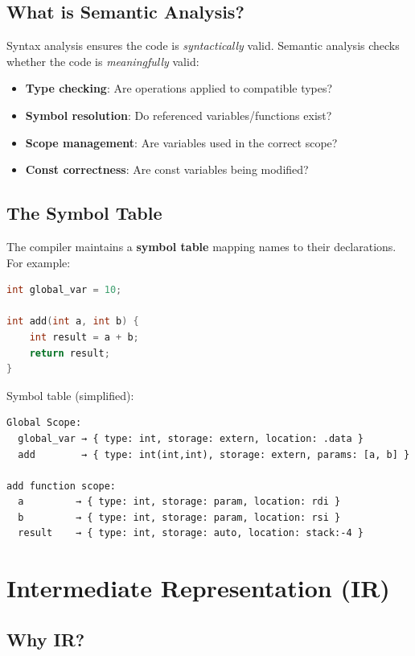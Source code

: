 \subsection{What is Semantic Analysis?}

Syntax analysis ensures the code is \textit{syntactically} valid. Semantic analysis checks whether the code is \textit{meaningfully} valid:
\begin{itemize}
    \item \textbf{Type checking}: Are operations applied to compatible types?
    \item \textbf{Symbol resolution}: Do referenced variables/functions exist?
    \item \textbf{Scope management}: Are variables used in the correct scope?
    \item \textbf{Const correctness}: Are const variables being modified?
\end{itemize}

\subsection{The Symbol Table}

The compiler maintains a \textbf{symbol table} mapping names to their declarations. For example:

\begin{lstlisting}[language=C]
int global_var = 10;

int add(int a, int b) {
    int result = a + b;
    return result;
}
\end{lstlisting}

Symbol table (simplified):
\begin{verbatim}
Global Scope:
  global_var → { type: int, storage: extern, location: .data }
  add        → { type: int(int,int), storage: extern, params: [a, b] }

add function scope:
  a         → { type: int, storage: param, location: rdi }
  b         → { type: int, storage: param, location: rsi }
  result    → { type: int, storage: auto, location: stack:-4 }
\end{verbatim}

\section{Intermediate Representation (IR)}

\subsection{Why IR?}


